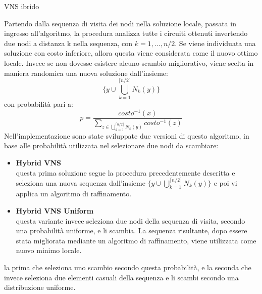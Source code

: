 \begin{algorithm}[H]
\DontPrintSemicolon
{}
\BlankLine
{}
 \caption{VNS ibrido}
\end{algorithm}
Partendo dalla sequenza di visita dei nodi nella soluzione locale, passata in ingresso all'algoritmo, la procedura analizza tutte i circuiti ottenuti invertendo due nodi a distanza k nella sequenza, con $k=1,...,n/2$. Se viene individuata una soluzione con costo inferiore, allora questa viene considerata come il nuovo ottimo locale. Invece se non dovesse esistere alcuno scambio migliorativo, viene scelta in maniera randomica una nuova soluzione dall'insieme:
$$\biggl\{{y}\cup \bigcup_{k=1}^{\lceil n/2 \rceil}{N_k(y)}\biggr\}$$
con probabilità pari a:
$$p=\frac{costo^{-1}(x)}{\underset{z \in {\bigcup_{k=1}^{\lceil n/2 \rceil}{N_k(y)}}}\sum{costo^{-1}(z)}}$$
Nell'implementazione sono state sviluppate due versioni di questo algoritmo, in base alle probabilità utilizzata nel selezionare due nodi da scambiare: 
\begin{itemize}
\item{\textbf{Hybrid VNS}\\
questa prima soluzione segue la procedura precedentemente descritta e seleziona una nuova sequenza dall'insieme $\{{y}\cup \bigcup_{k=1}^{\lceil n/2 \rceil}{N_k(y)}\}$ e poi vi applica un algoritmo di raffinamento.} 
\item{\textbf{Hybrid VNS Uniform}\\
questa variante invece seleziona due nodi della sequenza di visita, secondo una probabilità uniforme, e li scambia. La sequenza risultante, dopo essere stata migliorata mediante un algoritmo di raffinamento, viene utilizzata come nuovo minimo locale.}
\end{itemize}
la prima che seleziona uno scambio secondo questa probabilità, e la seconda che invece seleziona due elementi casuali della sequenza e li scambi secondo una distribuzione uniforme.

